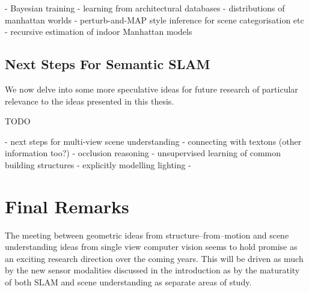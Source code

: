   - Bayesian training
    - learning from architectural databases
  - distributions of manhattan worlds
    - perturb-and-MAP style inference for scene categorisation etc
  - recursive estimation of indoor Manhattan models

\subsection{Next Steps For Semantic SLAM}

We now delve into some more speculative ideas for future research of
particular relevance to the ideas presented in this thesis.

TODO

- next steps for multi-view scene understanding
  - connecting with textons (other information too?)
  - occlusion reasoning
  - unsupervised learning of common building structures
  - explicitly modelling lighting
  - 

\section{Final Remarks}

The meeting between geometric ideas from structure--from--motion and
scene understanding ideas from single view computer vision seems to
hold promise as an exciting research direction over the coming
years. This will be driven as much by the new sensor modalities
discussed in the introduction as by the maturatity of both SLAM and
scene understanding as separate areas of study. 

